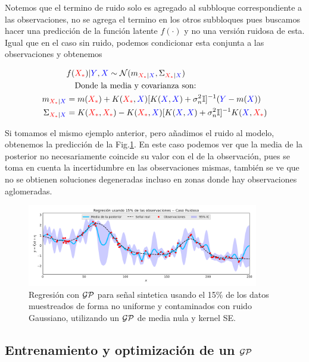 Notemos que el termino de ruido solo es agregado al subbloque correspondiente a las observaciones, no se agrega el termino en los otros subbloques pues buscamos hacer una predicción de la función latente $f(\cdot)$ y no una versión ruidosa de esta.
Igual que en el caso sin ruido, podemos condicionar esta conjunta a las observaciones y obtenemos

\begin{align}
	& f(\textcolor{red}{X_*})|\textcolor{blue}{Y}, \textcolor{blue}{X}  \sim \mathcal{N}(m_{\textcolor{red}{X_*}|\textcolor{blue}{X}}, \Sigma_{\textcolor{red}{X_*}|\textcolor{blue}{X}})\\ \label{eq:gp_posterior}
	& \quad \text{Donde la media y covarianza son:} \nonumber \\
	m_{\textcolor{red}{X_*}|\textcolor{blue}{X}} & = m(\textcolor{red}{X_*}) + K(\textcolor{red}{X_*}, \textcolor{blue}{X}) [K(\textcolor{blue}{X}, \textcolor{blue}{X}) + \sigma_n^2 {\mathbb I}]^{-1} (\textcolor{blue}{Y} - m(\textcolor{blue}{X}))\\
	 \Sigma_{\textcolor{red}{X_*}|\textcolor{blue}{X}} & = K(\textcolor{red}{X_*}, \textcolor{red}{X_*}) - K(\textcolor{red}{X_*}, \textcolor{blue}{X}) [K(\textcolor{blue}{X}, \textcolor{blue}{X}) + \sigma_n^2 {\mathbb I}]^{-1} K(\textcolor{blue}{X}, \textcolor{red}{X_*})
\end{align}


Si tomamos el mismo ejemplo anterior, pero añadimos el ruido al modelo, obtenemos la predicción de la Fig.\ref{fig:gp_3}. En este caso podemos ver que la media de la posterior no necesariamente coincide su valor con el de la observación, pues se toma en cuenta la incertidumbre en las observaciones mismas, también se ve que no se obtienen soluciones degeneradas incluso en zonas donde hay observaciones aglomeradas.


\begin{figure}[H]
	\centering
	\includegraphics[width=0.9\textwidth]{img/gp_posterior_noisy.pdf}
	\caption{Regresión con $\mathcal{GP}$ para señal sintetica usando el 15$\%$ de los datos muestreados de forma no uniforme y contaminados con ruido Gaussiano, utilizando un $\mathcal{GP}$ de media nula y kernel SE.}
	\label{fig:gp_3}
\end{figure}



\subsection{Entrenamiento y optimización de un $\mathcal{GP}$}

